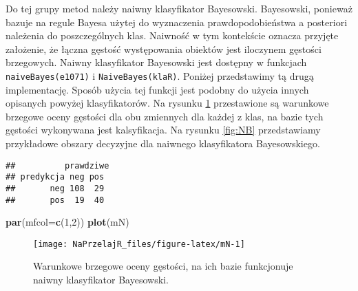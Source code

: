 \documentclass[polish,]{book}
\newenvironment{Shaded}{\begin{snugshade}}{\end{snugshade}}
\newcommand{\CommentTok}[1]{\textcolor[rgb]{0.56,0.35,0.01}{\textit{#1}}}
\newcommand{\DataTypeTok}[1]{\textcolor[rgb]{0.13,0.29,0.53}{#1}}
\newcommand{\DecValTok}[1]{\textcolor[rgb]{0.00,0.00,0.81}{#1}}
\newcommand{\KeywordTok}[1]{\textcolor[rgb]{0.13,0.29,0.53}{\textbf{#1}}}
\newcommand{\NormalTok}[1]{#1}
\newcommand{\OperatorTok}[1]{\textcolor[rgb]{0.81,0.36,0.00}{\textbf{#1}}}
\newcommand{\StringTok}[1]{\textcolor[rgb]{0.31,0.60,0.02}{#1}}
\begin{document}
Do tej grupy metod należy naiwny klasyfikator Bayesowski. Bayesowski, ponieważ bazuje na regule Bayesa użytej do wyznaczenia prawdopodobieństwa a posteriori
należenia do poszczególnych klas. Naiwność w tym kontekście oznacza przyjęte założenie, że łączna gęstość występowania obiektów jest iloczynem gęstości brzegowych.
Naiwny klasyfikator Bayesowski jest dostępny w funkcjach \texttt{naiveBayes(e1071)} i \texttt{NaiveBayes(klaR)}.
Poniżej przedstawimy tą drugą implementację.
Sposób użycia tej funkcji jest podobny do użycia innych opisanych powyżej klasyfikatorów. Na rysunku \ref{fig:mN} przestawione są warunkowe brzegowe oceny gęstości dla
obu zmiennych dla każdej z klas, na bazie tych gęstości wykonywana jest kalsyfikacja. Na rysunku \ref{fig:NB} przedstawiamy przykładowe obszary decyzyjne dla naiwnego klasyfikatora Bayesowskiego.

\begin{Shaded}
\end{Shaded}

\begin{verbatim}
##          prawdziwe
## predykcja neg pos
##       neg 108  29
##       pos  19  40
\end{verbatim}

\begin{Shaded}
\begin{Highlighting}[]
\KeywordTok{par}\NormalTok{(}\DataTypeTok{mfcol=}\KeywordTok{c}\NormalTok{(}\DecValTok{1}\NormalTok{,}\DecValTok{2}\NormalTok{))}
\KeywordTok{plot}\NormalTok{(mN)}
\end{Highlighting}
\end{Shaded}

\begin{figure}[h]

{\centering \texttt{[image: NaPrzelajR\_files/figure-latex/mN-1]} 

}

\caption{Warunkowe brzegowe oceny gęstości, na ich bazie funkcjonuje naiwny klasyfikator Bayesowski.}\label{fig:mN}
\end{figure}
\end{document}
